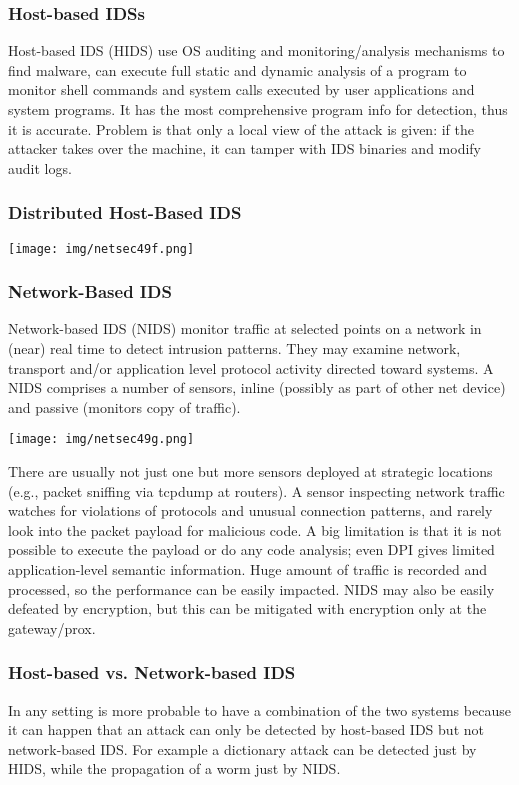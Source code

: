 \documentclass[a4paper, 10pt, titlepage]{article}
\begin{document}
\subsubsection*{Host-based IDSs}
Host-based IDS (HIDS) use OS auditing and monitoring/analysis mechanisms to find malware, can execute full static and dynamic analysis of a program to monitor shell commands and system calls executed by user applications and system programs. It has the most comprehensive program info for detection, thus it is accurate. Problem is that only a local view of the attack is given: if the attacker takes over the machine, it can tamper with IDS binaries and modify audit logs.

\subsubsection*{Distributed Host-Based IDS}
\begin{center}
	\texttt{[image: img/netsec49f.png]}
\end{center}

\subsubsection*{Network-Based IDS}
Network-based IDS (NIDS) monitor traffic at selected points on a network in (near) real time to detect intrusion patterns. They may examine network, transport and/or application level protocol activity directed toward systems. A NIDS comprises a number of sensors, inline (possibly as part of other net device) and passive (monitors copy of traffic).
\begin{center}
	\texttt{[image: img/netsec49g.png]}
\end{center}
There are usually not just one but more sensors deployed at strategic locations (e.g., packet sniffing via tcpdump at routers). 
A sensor inspecting network traffic watches for violations of protocols and unusual connection patterns, and rarely look into the packet payload for malicious code. A big limitation is that it is not possible to execute the payload or do any code analysis; even DPI gives limited application-level semantic information. Huge amount of traffic is recorded and processed, so the performance can be easily impacted. NIDS may also be easily defeated by encryption, but this can be mitigated with encryption only at the gateway/prox.

\subsubsection*{Host-based vs. Network-based IDS}
In any setting is more probable to have a combination of the two systems because it can happen that an attack can only be detected by host-based IDS but not network-based IDS. For example a dictionary attack can be detected just by HIDS, while the propagation of a worm just by NIDS. %
\end{document}
